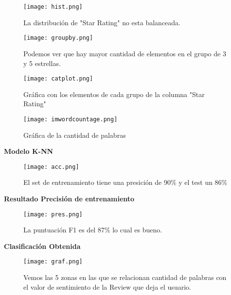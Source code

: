 \documentclass{article}
\begin{document}
\begin{figure}[H]
    \centering
    \texttt{[image: hist.png]}
    \caption{{\small La distribución de "Star Rating" no esta balanceada.}}
    \label{figura03}
\end{figure}

\begin{figure}[H]
    \centering
    \texttt{[image: groupby.png]}
    \caption{{\small Podemos ver que hay mayor cantidad de elementos en el grupo de 3 y 5 estrellas.}}
    \label{figura04}
\end{figure}


\begin{figure}[H]
    \centering
    \texttt{[image: catplot.png]}
    \caption{{\small Gráfica con los elementos de cada grupo de la columna "Star Rating"}}
    \label{figura05}
\end{figure}

\begin{figure}[H]
    \centering
    \texttt{[image: imwordcountage.png]}
    \caption{{\small Gráfica de la cantidad de palabras}}
    \label{figura06}
\end{figure}



\textbf{Modelo K-NN}


\begin{figure}[H]
    \centering
    \texttt{[image: acc.png]}
    \caption{{\small El set de entrenamiento tiene una presición de 90\% y el test un 86\%}}
    \label{figura07}
\end{figure}


\textbf{Resultado Precisión de entrenamiento}

\begin{figure}[H]
    \centering
    \texttt{[image: pres.png]}
    \caption{{\small La puntuación F1 es del 87\% lo cual es bueno.}}
    \label{figura08}
\end{figure}



\textbf{Clasificación Obtenida}


\begin{figure}[H]
    \centering
    \texttt{[image: graf.png]}
    \caption{{\small Vemos las 5 zonas en las que se relacionan cantidad de palabras con el valor de sentimiento de la
Review que deja el usuario.}}
    \label{figura09}
\end{figure}
\end{document}
